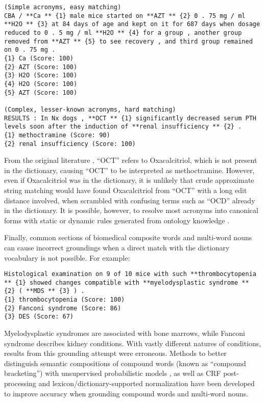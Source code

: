 \documentclass[10pt, oneside]{article}
\begin{document}
\begin{lstlisting}[breaklines]
(Simple acronyms, easy matching)
CBA / **Ca ** {1} male mice started on **AZT ** {2} 0 . 75 mg / ml **H2O ** {3} at 84 days of age and kept on it for 687 days when dosage reduced to 0 . 5 mg / ml **H2O ** {4} for a group , another group removed from **AZT ** {5} to see recovery , and third group remained on 0 . 75 mg . 
{1} Ca (Score: 100)
{2} AZT (Score: 100)
{3} H2O (Score: 100)
{4} H2O (Score: 100)
{5} AZT (Score: 100)

(Complex, lesser-known acronyms, hard matching)
RESULTS : In Nx dogs , **OCT ** {1} significantly decreased serum PTH levels soon after the induction of **renal insufficiency ** {2} . 
{1} methoctramine (Score: 90)
{2} renal insufficiency (Score: 100)
\end{lstlisting}

From the original literature \cite{monier199922}, ``OCT'' refers to Oxacalcitriol, which is not present in the dictionary, causing ``OCT'' to be interpreted as methoctramine. However, even if Oxacalcitriol was in the dictionary, it is unlikely that crude approximate string matching would have found Oxacalcitriol from ``OCT'' with a long edit distance involved, when scrambled with confusing terms such as ``OCD'' already in the dictionary. It is possible, however, to resolve most acronyms into canonical forms with static or dynamic rules generated from ontology knowledge \cite{naderi2011organismtagger}.

Finally, common sections of biomedical composite words and multi-word nouns can cause incorrect groundings when a direct match with the dictionary vocabulary is not possible. For example:

\begin{lstlisting}[breaklines]
Histological examination on 9 of 10 mice with such **thrombocytopenia ** {1} showed changes compatible with **myelodysplastic syndrome ** {2} ( **MDS ** {3} ) . 
{1} thrombocytopenia (Score: 100)
{2} Fanconi syndrome (Score: 86)
{3} DES (Score: 67)
\end{lstlisting}

Myelodysplastic syndromes are associated with bone marrows, while Fanconi syndrome describes kidney conditions. With vastly different natures of conditions, results from this grounding attempt were erroneous. Methods to better distinguish semantic compositions of compound words (known as ``compound bracketing'') with unsupervised probabilistic models \cite{pecina2010lexical}, as well as CRF post-processing and lexicon/dictionary-supported normalization \cite{lee2016audis} have been developed to improve accuracy when grounding compound words and multi-word nouns.
\end{document}
